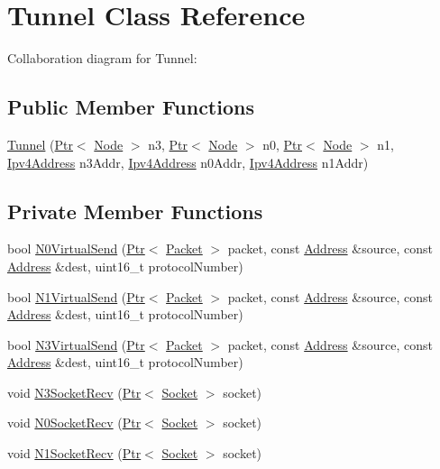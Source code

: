\hypertarget{classTunnel}{}\section{Tunnel Class Reference}
\label{classTunnel}


Collaboration diagram for Tunnel\+:
\subsection*{Public Member Functions}
\begin{DoxyCompactItemize}
\item 
\hyperlink{classTunnel_af5941266fdb3798bb27c026da801d28d}{Tunnel} (\hyperlink{classns3_1_1Ptr}{Ptr}$<$ \hyperlink{classns3_1_1Node}{Node} $>$ n3, \hyperlink{classns3_1_1Ptr}{Ptr}$<$ \hyperlink{classns3_1_1Node}{Node} $>$ n0, \hyperlink{classns3_1_1Ptr}{Ptr}$<$ \hyperlink{classns3_1_1Node}{Node} $>$ n1, \hyperlink{classns3_1_1Ipv4Address}{Ipv4\+Address} n3\+Addr, \hyperlink{classns3_1_1Ipv4Address}{Ipv4\+Address} n0\+Addr, \hyperlink{classns3_1_1Ipv4Address}{Ipv4\+Address} n1\+Addr)
\end{DoxyCompactItemize}
\subsection*{Private Member Functions}
\begin{DoxyCompactItemize}
\item 
bool \hyperlink{classTunnel_a1ad70a1533c49e4db523ca7a283c2d6c}{N0\+Virtual\+Send} (\hyperlink{classns3_1_1Ptr}{Ptr}$<$ \hyperlink{classns3_1_1Packet}{Packet} $>$ packet, const \hyperlink{classns3_1_1Address}{Address} \&source, const \hyperlink{classns3_1_1Address}{Address} \&dest, uint16\+\_\+t protocol\+Number)
\item 
bool \hyperlink{classTunnel_abfa89bddba388fcea92e9d981123b3d8}{N1\+Virtual\+Send} (\hyperlink{classns3_1_1Ptr}{Ptr}$<$ \hyperlink{classns3_1_1Packet}{Packet} $>$ packet, const \hyperlink{classns3_1_1Address}{Address} \&source, const \hyperlink{classns3_1_1Address}{Address} \&dest, uint16\+\_\+t protocol\+Number)
\item 
bool \hyperlink{classTunnel_a9114f45eb031e50c550427103162ec8a}{N3\+Virtual\+Send} (\hyperlink{classns3_1_1Ptr}{Ptr}$<$ \hyperlink{classns3_1_1Packet}{Packet} $>$ packet, const \hyperlink{classns3_1_1Address}{Address} \&source, const \hyperlink{classns3_1_1Address}{Address} \&dest, uint16\+\_\+t protocol\+Number)
\item 
void \hyperlink{classTunnel_a28a444f24b83c91cb4114843a92b9c1a}{N3\+Socket\+Recv} (\hyperlink{classns3_1_1Ptr}{Ptr}$<$ \hyperlink{classns3_1_1Socket}{Socket} $>$ socket)
\item 
void \hyperlink{classTunnel_a0962f5cfffb52bdda390e04b9fd477fd}{N0\+Socket\+Recv} (\hyperlink{classns3_1_1Ptr}{Ptr}$<$ \hyperlink{classns3_1_1Socket}{Socket} $>$ socket)
\item 
void \hyperlink{classTunnel_aa361721cb2347cd6d7618ed10c07db53}{N1\+Socket\+Recv} (\hyperlink{classns3_1_1Ptr}{Ptr}$<$ \hyperlink{classns3_1_1Socket}{Socket} $>$ socket)
\end{DoxyCompactItemize}

